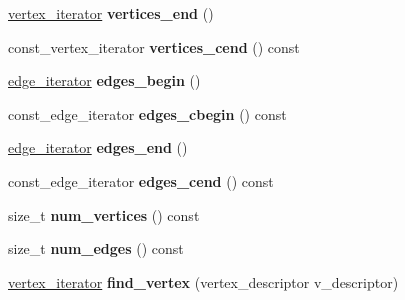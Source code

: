 \begin{DoxyCompactItemize}
\item 
\hypertarget{classmystl_1_1graph_ae03d839b0bc65ae3337519aa791ac485}{\hyperlink{classmystl_1_1graph_a173b6e21e17fd9bafdd7594b2ba3ef0a}{vertex\+\_\+iterator} {\bfseries vertices\+\_\+end} ()}\label{classmystl_1_1graph_ae03d839b0bc65ae3337519aa791ac485}

\item 
\hypertarget{classmystl_1_1graph_ae6dc5a4a8da0990502bfcd146854a305}{const\+\_\+vertex\+\_\+iterator {\bfseries vertices\+\_\+cend} () const }\label{classmystl_1_1graph_ae6dc5a4a8da0990502bfcd146854a305}

\item 
\hypertarget{classmystl_1_1graph_af61b17c57aeb83bf8c66979276ad7941}{\hyperlink{classmystl_1_1graph_aca4e86526b9606bc4a568b0c4e127b3f}{edge\+\_\+iterator} {\bfseries edges\+\_\+begin} ()}\label{classmystl_1_1graph_af61b17c57aeb83bf8c66979276ad7941}

\item 
\hypertarget{classmystl_1_1graph_ace540bc4fda9c0a5a6701c252af21a1a}{const\+\_\+edge\+\_\+iterator {\bfseries edges\+\_\+cbegin} () const }\label{classmystl_1_1graph_ace540bc4fda9c0a5a6701c252af21a1a}

\item 
\hypertarget{classmystl_1_1graph_aecd73d2b1bebbe9ea30f813709db1006}{\hyperlink{classmystl_1_1graph_aca4e86526b9606bc4a568b0c4e127b3f}{edge\+\_\+iterator} {\bfseries edges\+\_\+end} ()}\label{classmystl_1_1graph_aecd73d2b1bebbe9ea30f813709db1006}

\item 
\hypertarget{classmystl_1_1graph_adfecdeafcf7092e0f715ebd9c221c1bd}{const\+\_\+edge\+\_\+iterator {\bfseries edges\+\_\+cend} () const }\label{classmystl_1_1graph_adfecdeafcf7092e0f715ebd9c221c1bd}

\item 
\hypertarget{classmystl_1_1graph_aa6fd8efc0911be8bd65f659d4d717bc9}{size\+\_\+t {\bfseries num\+\_\+vertices} () const }\label{classmystl_1_1graph_aa6fd8efc0911be8bd65f659d4d717bc9}

\item 
\hypertarget{classmystl_1_1graph_a659585bd8325746aa743b5103753405b}{size\+\_\+t {\bfseries num\+\_\+edges} () const }\label{classmystl_1_1graph_a659585bd8325746aa743b5103753405b}

\item 
\hypertarget{classmystl_1_1graph_a1565ecbd61037a48bee3e0d969c6b57b}{\hyperlink{classmystl_1_1graph_a173b6e21e17fd9bafdd7594b2ba3ef0a}{vertex\+\_\+iterator} {\bfseries find\+\_\+vertex} (vertex\+\_\+descriptor v\+\_\+descriptor)}\label{classmystl_1_1graph_a1565ecbd61037a48bee3e0d969c6b57b}


\end{DoxyCompactItemize}
